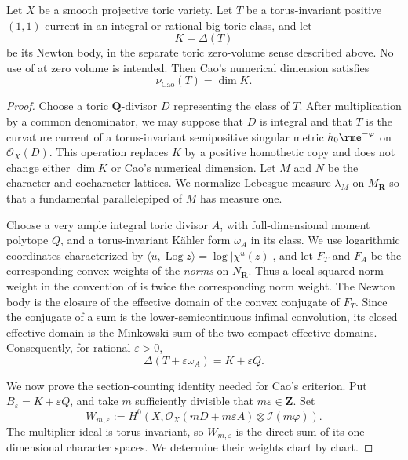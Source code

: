 \begin{theorem}\label{thm:ok-toric-zero-mass}
Let \(X\) be a smooth projective toric variety.
Let \(T\) be a torus-invariant positive \((1,1)\)-current in an integral or
rational big toric class, and let
\[
                             K=\Delta(T)
\]
be its Newton body, in the separate toric zero-volume sense described
above.  No use of  at zero volume is
intended.
Then Cao's numerical dimension satisfies
\[
                         \nu_{\mathrm{Cao}}(T)=\dim K.
\tag{55.50}\label{eq:ok-toric-numdim}
\]
\end{theorem}

\begin{proof}
Choose a toric \(\mathbf Q\)-divisor \(D\) representing the class of \(T\).
After multiplication by a common denominator, we may suppose that \(D\) is
integral and that \(T\) is the curvature current of a torus-invariant
semipositive singular metric \(h_0\rme^{-\varphi}\) on
\(\mathcal O_X(D)\).  This operation replaces \(K\) by a positive homothetic
copy and does not change either \(\dim K\) or Cao's numerical dimension.  Let
\(M\) and \(N\) be the character and cocharacter lattices.  We normalize
Lebesgue measure \(\lambda_M\) on \(M_{\mathbf R}\) so that a fundamental
parallelepiped of \(M\) has measure one.

Choose a very ample integral toric divisor \(A\), with full-dimensional
moment polytope \(Q\), and a torus-invariant K\"ahler form \(\omega_A\) in
its class.  We use logarithmic coordinates characterized by
\(\langle u,\operatorname{Log}z\rangle=\log|\chi^u(z)|\), and let
\(F_T\) and \(F_A\)
be the corresponding convex weights of the \emph{norms} on
\(N_{\mathbf R}\).  Thus a local squared-norm weight in the convention of
 is twice the corresponding norm weight.  The
Newton body is the closure of the effective domain of the convex conjugate
of \(F_T\).  Since the conjugate of a sum is the
lower-semicontinuous infimal convolution, its closed effective domain is the
Minkowski sum of the two compact effective domains.  Consequently, for
rational \(\varepsilon>0\),
\[
                  \Delta(T+\varepsilon\omega_A)=K+\varepsilon Q.
\tag{55.51}\label{eq:ok-toric-minkowski}
\]

We now prove the section-counting identity needed for Cao's criterion.  Put
\(B_\varepsilon=K+\varepsilon Q\), and take \(m\) sufficiently divisible that
\(m\varepsilon\in\mathbf Z\).  Set
\[
 W_{m,\varepsilon}:=
 H^0\!\left(X,\mathcal O_X(mD+m\varepsilon A)
                 \otimes\mathcal I(m\varphi)\right).
\]
The multiplier ideal is torus invariant, so \(W_{m,\varepsilon}\) is the
direct sum of its one-dimensional character spaces.  We determine their
weights chart by chart.


\end{proof}
